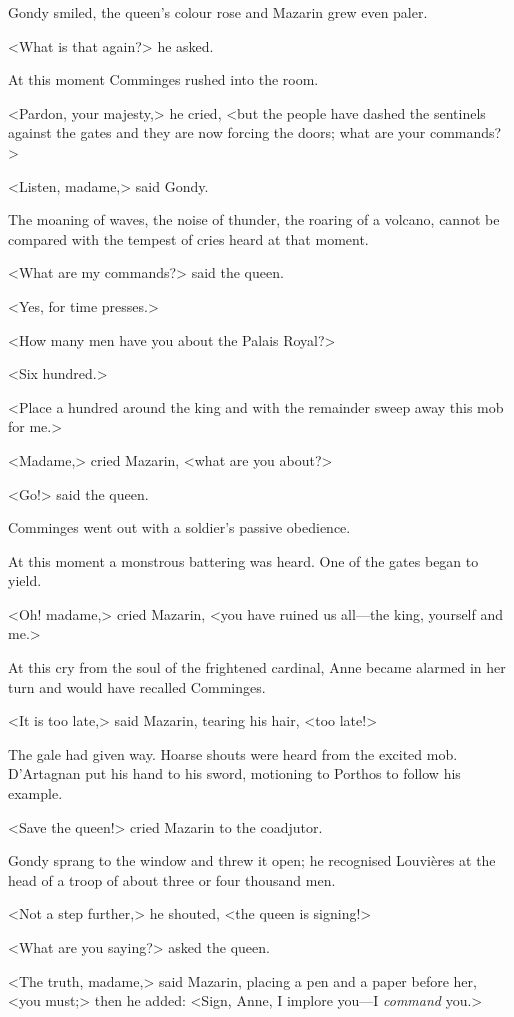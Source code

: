 Gondy smiled, the queen's colour rose and Mazarin grew even paler.

<What is that again?> he asked.

At this moment Comminges rushed into the room.

<Pardon, your majesty,> he cried, <but the people have dashed the sentinels against the gates and they are now forcing the doors; what are your commands?>

<Listen, madame,> said Gondy.

The moaning of waves, the noise of thunder, the roaring of a volcano, cannot be compared with the tempest of cries heard at that moment.

<What are my commands?> said the queen.

<Yes, for time presses.>

<How many men have you about the Palais Royal?>

<Six hundred.>

<Place a hundred around the king and with the remainder sweep away this mob for me.>

<Madame,> cried Mazarin, <what are you about?>

<Go!> said the queen.

Comminges went out with a soldier's passive obedience.

At this moment a monstrous battering was heard. One of the gates began to yield.

<Oh! madame,> cried Mazarin, <you have ruined us all—the king, yourself and me.>

At this cry from the soul of the frightened cardinal, Anne became alarmed in her turn and would have recalled Comminges.

<It is too late,> said Mazarin, tearing his hair, <too late!>

The gale had given way. Hoarse shouts were heard from the excited mob. D'Artagnan put his hand to his sword, motioning to Porthos to follow his example.

<Save the queen!> cried Mazarin to the coadjutor.

Gondy sprang to the window and threw it open; he recognised Louvières at the head of a troop of about three or four thousand men.

<Not a step further,> he shouted, <the queen is signing!>

<What are you saying?> asked the queen.

<The truth, madame,> said Mazarin, placing a pen and a paper before her, <you must;> then he added: <Sign, Anne, I implore you—I \emph{command} you.>

